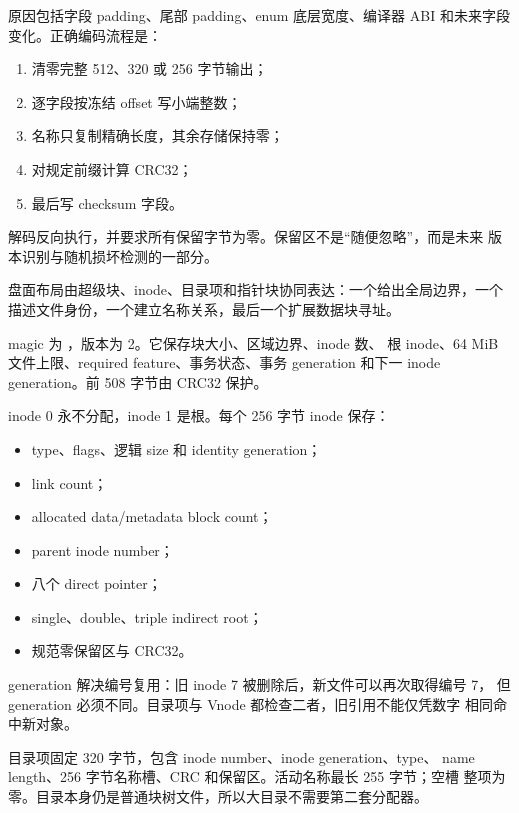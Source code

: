 原因包括字段 padding、尾部 padding、enum 底层宽度、编译器 ABI 和未来字段
变化。正确编码流程是：

\begin{enumerate}
  \item 清零完整 512、320 或 256 字节输出；
  \item 逐字段按冻结 offset 写小端整数；
  \item 名称只复制精确长度，其余存储保持零；
  \item 对规定前缀计算 CRC32；
  \item 最后写 checksum 字段。
\end{enumerate}

解码反向执行，并要求所有保留字节为零。保留区不是“随便忽略”，而是未来
版本识别与随机损坏检测的一部分。

盘面布局由超级块、inode、目录项和指针块协同表达：一个给出全局边界，一个
描述文件身份，一个建立名称关系，最后一个扩展数据块寻址。


magic 为 ，版本为 2。它保存块大小、区域边界、inode 数、
根 inode、64 MiB 文件上限、required feature、事务状态、事务 generation
和下一 inode generation。前 508 字节由 CRC32 保护。


inode 0 永不分配，inode 1 是根。每个 256 字节 inode 保存：

\begin{itemize}
  \item type、flags、逻辑 size 和 identity generation；
  \item link count；
  \item allocated data/metadata block count；
  \item parent inode number；
  \item 八个 direct pointer；
  \item single、double、triple indirect root；
  \item 规范零保留区与 CRC32。
\end{itemize}

generation 解决编号复用：旧 inode 7 被删除后，新文件可以再次取得编号 7，
但 generation 必须不同。目录项与 Vnode 都检查二者，旧引用不能仅凭数字
相同命中新对象。


目录项固定 320 字节，包含 inode number、inode generation、type、
name length、256 字节名称槽、CRC 和保留区。活动名称最长 255 字节；空槽
整项为零。目录本身仍是普通块树文件，所以大目录不需要第二套分配器。

